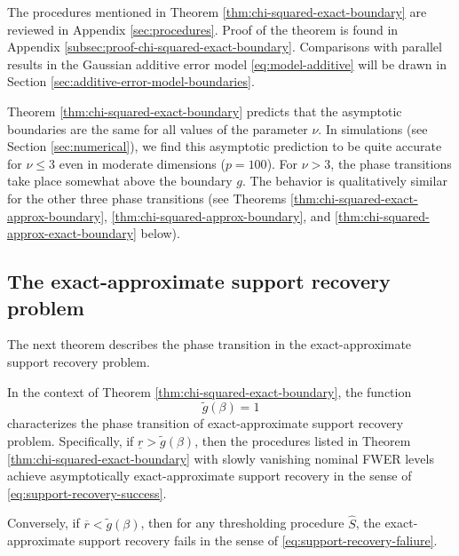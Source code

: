 The procedures mentioned in Theorem \ref{thm:chi-squared-exact-boundary} are reviewed in Appendix \ref{sec:procedures}. 
Proof of the theorem is found in Appendix \ref{subsec:proof-chi-squared-exact-boundary}. 
Comparisons with parallel results in the Gaussian additive error model \eqref{eq:model-additive} will be drawn in Section \ref{sec:additive-error-model-boundaries}.

\begin{remark} \label{rmk:strong-classification-boundary-2}
Theorem \ref{thm:chi-squared-exact-boundary} predicts that the asymptotic boundaries are the same for all values of the parameter $\nu$.
In simulations (see Section \ref{sec:numerical}), we find this asymptotic prediction to be quite accurate for $\nu\le3$ even in moderate dimensions ($p=100$). 
For $\nu>3$, the phase transitions take place somewhat above the boundary ${g}$.
The behavior is qualitatively similar for the other three phase transitions (see Theorems \ref{thm:chi-squared-exact-approx-boundary}, \ref{thm:chi-squared-approx-boundary}, and \ref{thm:chi-squared-approx-exact-boundary} below).
\end{remark}

\subsection{The exact-approximate support recovery problem}
\label{subsec:exact-approx-support-recovery-boundary}

The next theorem describes the phase transition in the exact-approximate support recovery problem.

\begin{theorem} \label{thm:chi-squared-exact-approx-boundary}
In the context of Theorem \ref{thm:chi-squared-exact-boundary}, 
the function 
\begin{equation} \label{eq:exact-approx-boundary-chisquared}
    \widetilde{g}(\beta) = 1
\end{equation}
characterizes the phase transition of exact-approximate support recovery problem.
Specifically, if $\underline{r} > \widetilde{g}(\beta)$, then the procedures listed in Theorem \ref{thm:chi-squared-exact-boundary} with slowly vanishing nominal FWER levels achieve asymptotically exact-approximate support recovery in the sense of \eqref{eq:support-recovery-success}. 

Conversely, if $\overline{r} < \widetilde{g}(\beta)$, then for any thresholding procedure $\widehat{S}$, the exact-approximate support recovery fails in the sense of \eqref{eq:support-recovery-faliure}.
\end{theorem}

